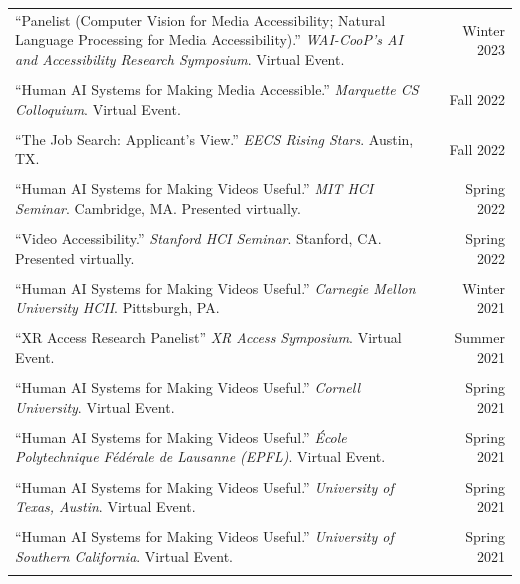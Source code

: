 \begin{longtable}{Xr}
	``Panelist (Computer Vision for Media Accessibility; Natural Language Processing for Media Accessibility).'' \textit{WAI-CooP’s AI and Accessibility Research Symposium}. Virtual Event. & Winter 2023 \\
	\\

	``Human AI Systems for Making Media Accessible.'' \textit{Marquette CS Colloquium}. Virtual Event. & Fall 2022 \\
	\\

	``The Job Search: Applicant's View.'' \textit{EECS Rising Stars}. Austin, TX. & Fall 2022 \\
	\\

	``Human AI Systems for Making Videos Useful.'' \textit{MIT HCI Seminar}. Cambridge, MA. Presented virtually. & Spring 2022 \\
	\\

	``Video Accessibility.'' \textit{Stanford HCI Seminar}. Stanford, CA. Presented virtually. & Spring 2022 \\
	\\

	``Human AI Systems for Making Videos Useful.'' \textit{Carnegie Mellon University HCII}. Pittsburgh, PA. & Winter 2021 \\
	\\

	``XR Access Research Panelist'' \textit{XR Access Symposium}. Virtual Event. & Summer 2021 \\
	\\

	``Human AI Systems for Making Videos Useful.'' \textit{Cornell University}. Virtual Event. & Spring 2021 \\
	\\

	``Human AI Systems for Making Videos Useful.'' \textit{École Polytechnique Fédérale de Lausanne (EPFL)}. Virtual Event. & Spring 2021 \\
	\\

	``Human AI Systems for Making Videos Useful.'' \textit{University of Texas, Austin}. Virtual Event. & Spring 2021 \\
	\\

	``Human AI Systems for Making Videos Useful.'' \textit{University of Southern California}. Virtual Event. & Spring 2021 \\
	\\


\end{longtable}

